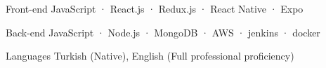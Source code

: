 

\begin{cvskills}

  \cvskill
    {Front-end} %
    {JavaScript · React.js · Redux.js · React Native · Expo} %

  \cvskill
    {Back-end} %
    {JavaScript · Node.js · MongoDB · AWS · jenkins · docker} %

  \cvskill
    {Languages} %
    {Turkish (Native), English (Full professional proficiency)} %

\end{cvskills}
